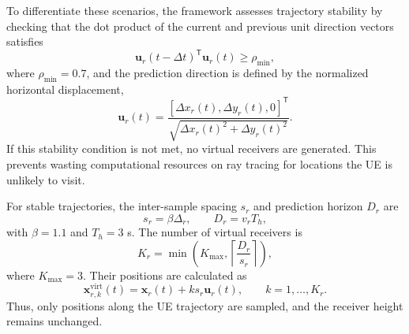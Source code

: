 To differentiate these scenarios, the framework assesses trajectory stability by checking that the dot product of the current and previous unit direction vectors satisfies
\begin{equation}
    \mathbf{u}_r(t-\Delta t)^{\mathsf{T}}\mathbf{u}_r(t)\geq \rho_{\min},
\end{equation}
where $\rho_{\min}=0.7$, and the prediction direction is defined by the normalized horizontal displacement,
\begin{equation}
    \mathbf{u}_r(t)=
    \frac{[\Delta x_r(t),\Delta y_r(t),0]^{\mathsf{T}}}
    {\sqrt{\Delta x_r(t)^2+\Delta y_r(t)^2}} .
\end{equation}
If this stability condition is not met, no virtual receivers are generated.
This prevents wasting computational resources on ray tracing for locations the UE is unlikely to visit.

For stable trajectories, the inter-sample spacing $s_r$ and prediction horizon $D_r$ are
\begin{equation}
    s_r=\beta\Delta_r, \qquad D_r=v_rT_h,
\end{equation}
with $\beta=1.1$ and $T_h=3$ s.
The number of virtual receivers is
\begin{equation}
    K_r=\min\left(K_{\max},\left\lceil\frac{D_r}{s_r}\right\rceil\right),
\end{equation}
where $K_{\max}=3$.
Their positions are calculated as
\begin{equation}
    \mathbf{x}^{\mathrm{virt}}_{r,k}(t)
    =
    \mathbf{x}_r(t)+ks_r\mathbf{u}_r(t),
    \qquad k=1,\ldots,K_r .
\end{equation}
Thus, only positions along the UE trajectory are sampled, and the receiver height remains unchanged.